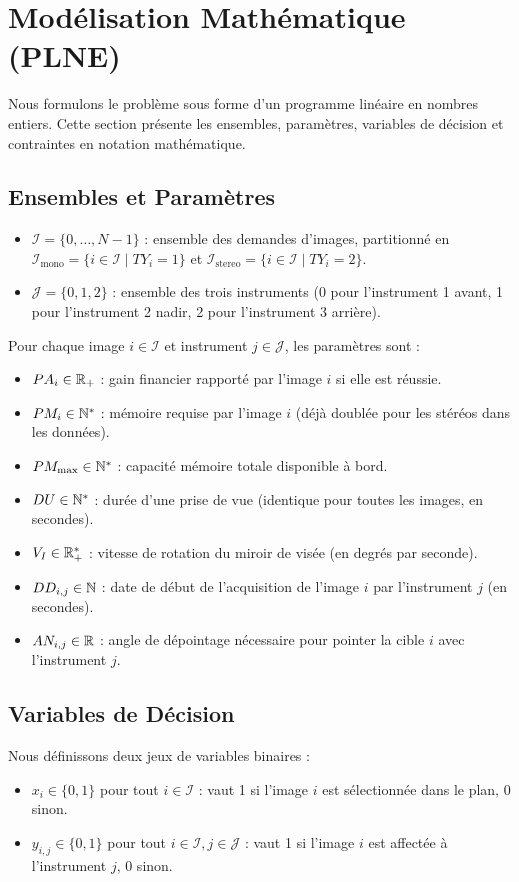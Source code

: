 \section{Modélisation Mathématique (PLNE)}

Nous formulons le problème sous forme d'un programme linéaire en nombres entiers. Cette section présente les ensembles, paramètres, variables de décision et contraintes en notation mathématique.

\subsection{Ensembles et Paramètres}
\begin{itemize}
    \item $\mathcal{I} = \{0, \dots, N-1\}$ : ensemble des demandes d'images, partitionné en $\mathcal{I}_{\text{mono}} = \{i \in \mathcal{I} \mid TY_i = 1\}$ et $\mathcal{I}_{\text{stereo}} = \{i \in \mathcal{I} \mid TY_i = 2\}$.
    \item $\mathcal{J} = \{0, 1, 2\}$ : ensemble des trois instruments (0 pour l'instrument 1 avant, 1 pour l'instrument 2 nadir, 2 pour l'instrument 3 arrière).
\end{itemize}

Pour chaque image $i \in \mathcal{I}$ et instrument $j \in \mathcal{J}$, les paramètres sont :
\begin{itemize}
    \item $PA_i \in \mathbb{R}_+$ : gain financier rapporté par l'image $i$ si elle est réussie.
    \item $PM_i \in \mathbb{N}^*$ : mémoire requise par l'image $i$ (déjà doublée pour les stéréos dans les données).
    \item $PM_{\max} \in \mathbb{N}^*$ : capacité mémoire totale disponible à bord.
    \item $DU \in \mathbb{N}^*$ : durée d'une prise de vue (identique pour toutes les images, en secondes).
    \item $V_I \in \mathbb{R}_+^*$ : vitesse de rotation du miroir de visée (en degrés par seconde).
    \item $DD_{i,j} \in \mathbb{N}$ : date de début de l'acquisition de l'image $i$ par l'instrument $j$ (en secondes).
    \item $AN_{i,j} \in \mathbb{R}$ : angle de dépointage nécessaire pour pointer la cible $i$ avec l'instrument $j$.
\end{itemize}

\subsection{Variables de Décision}
Nous définissons deux jeux de variables binaires :
\begin{itemize}
    \item $x_i \in \{0, 1\}$ pour tout $i \in \mathcal{I}$ : vaut 1 si l'image $i$ est sélectionnée dans le plan, 0 sinon.
    \item $y_{i,j} \in \{0, 1\}$ pour tout $i \in \mathcal{I}, j \in \mathcal{J}$ : vaut 1 si l'image $i$ est affectée à l'instrument $j$, 0 sinon.
\end{itemize}


